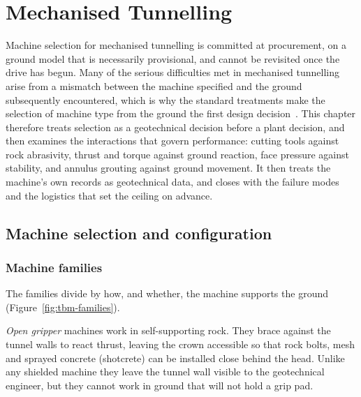 \chapter{Mechanised Tunnelling}
\label{ch:tbm}

Machine selection for mechanised tunnelling is committed at procurement, on a
ground model that is necessarily provisional, and cannot be revisited once the
drive has begun. Many of the serious difficulties met in mechanised tunnelling
arise from a mismatch between the machine specified and the ground
subsequently encountered, which is why the standard treatments make the
selection of machine type from the ground the first design
decision~\citep{maidl2008hardrock,maidl2012shield}. This chapter therefore
treats selection as a geotechnical decision before a plant decision, and then
examines the interactions that govern performance: cutting tools against rock
abrasivity, thrust and torque against ground reaction, face pressure against
stability, and annulus grouting against ground movement. It then treats the
machine's own records as geotechnical data, and closes with the failure modes
and the logistics that set the ceiling on advance.

\section{Machine selection and configuration}
\label{sec:machine-selection}

\subsection{Machine families}
\label{sec:machine-families}

The families divide by how, and whether, the machine supports the ground
(Figure~\ref{fig:tbm-families}).

\emph{Open gripper} machines work in self-supporting rock. They brace against
the tunnel walls to react thrust, leaving the crown accessible so that rock
bolts, mesh and sprayed concrete (shotcrete) can be installed close behind the head. Unlike any
shielded machine they leave the tunnel wall visible to the geotechnical
engineer, but they cannot work in ground that will not hold a grip pad.

